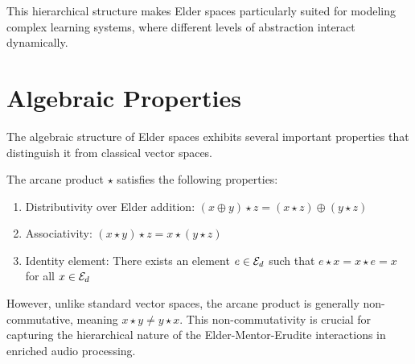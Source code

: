 This hierarchical structure makes Elder spaces particularly suited for modeling complex learning systems, where different levels of abstraction interact dynamically.

\section{Algebraic Properties}

The algebraic structure of Elder spaces exhibits several important properties that distinguish it from classical vector spaces.

\begin{proposition}
The arcane product $\star$ satisfies the following properties:
\begin{enumerate}
    \item Distributivity over Elder addition: $(x \oplus y) \star z = (x \star z) \oplus (y \star z)$
    \item Associativity: $(x \star y) \star z = x \star (y \star z)$
    \item Identity element: There exists an element $e \in \mathcal{E}_{d}$ such that $e \star x = x \star e = x$ for all $x \in \mathcal{E}_{d}$
\end{enumerate}
\end{proposition}

However, unlike standard vector spaces, the arcane product is generally non-commutative, meaning $x \star y \neq y \star x$. This non-commutativity is crucial for capturing the hierarchical nature of the Elder-Mentor-Erudite interactions in enriched audio processing.